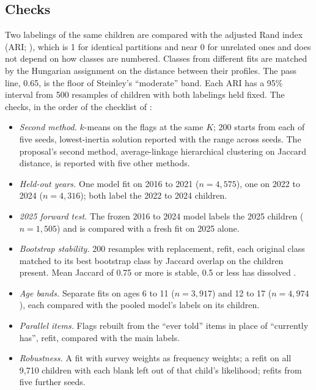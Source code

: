 \subsection{Checks}
\label{sec:checks}
Two labelings of the same children are compared with the adjusted Rand index (ARI; \citealp{hubert1985}), which is 1 for identical partitions and near 0 for unrelated ones and does not depend on how classes are numbered. Classes from different fits are matched by the Hungarian assignment on the distance between their profiles. The pass line, 0.65, is the floor of Steinley's \citeyearpar{steinley2004} ``moderate'' band. Each ARI has a 95\% interval from 500 resamples of children with both labelings held fixed. The checks, in the order of the checklist of \citet{agelink2021}:
\begin{itemize}\setlength\itemsep{1pt}
\item \emph{Second method.} $k$-means on the flags at the same $K$; 200 starts from each of five seeds, lowest-inertia solution reported with the range across seeds. The proposal's second method, average-linkage hierarchical clustering on Jaccard distance, is reported with five other methods.
\item \emph{Held-out years.} One model fit on 2016 to 2021 ($n=4{,}575$), one on 2022 to 2024 ($n=4{,}316$); both label the 2022 to 2024 children.
\item \emph{2025 forward test.} The frozen 2016 to 2024 model labels the 2025 children ($n=1{,}505$) and is compared with a fresh fit on 2025 alone.
\item \emph{Bootstrap stability.} 200 resamples with replacement, refit, each original class matched to its best bootstrap class by Jaccard overlap on the children present. Mean Jaccard of 0.75 or more is stable, 0.5 or less has dissolved \citep{hennig2007}.
\item \emph{Age bands.} Separate fits on ages 6 to 11 ($n=3{,}917$) and 12 to 17 ($n=4{,}974$), each compared with the pooled model's labels on its children.
\item \emph{Parallel items.} Flags rebuilt from the ``ever told'' items in place of ``currently has'', refit, compared with the main labels.
\item \emph{Robustness.} A fit with survey weights as frequency weights; a refit on all 9,710 children with each blank left out of that child's likelihood; refits from five further seeds.
\end{itemize}

